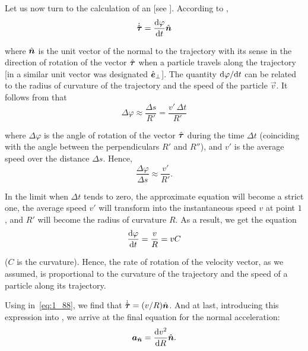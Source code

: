 Let us now turn to the calculation of an [see ]. According to ,
\begin{equation}\label{eq:1_88}
\dot{\hat{\boldsymbol{\tau}}} = \frac{\mathrm{d}\varphi}{\mathrm{d} t}\hat{\boldsymbol{n}}
\end{equation}

\noindent
where $\hat{\boldsymbol{n}}$ is the unit vector of the normal to the trajectory with its sense in the direction of rotation of the vector $\hat{\boldsymbol{\tau}}$ when a particle travels along the trajectory [in  a similar unit vector was designated $\hat{\boldsymbol{e}}_{\perp}$]. The quantity $\mathrm{d}\varphi/\mathrm{d} t$ can be related to the radius of curvature of the trajectory and the speed of the particle $\vec{v}$. It follows from  that
\begin{equation*}
\Delta\varphi\approx \frac{\Delta s}{R'} = \frac{v'\,\Delta t}{R'}
\end{equation*}

\noindent
where $\Delta\varphi$ is the angle of rotation of the vector $\hat{\boldsymbol{\tau}}$ during the time $\Delta t$ (coinciding with the angle between the perpendiculars $R'$ and $R''$), and $v'$ is the average speed over the distance $\Delta s$. Hence,
\begin{equation*}
\frac{\Delta\varphi}{\Delta s} \approx \frac{v'}{R'}.
\end{equation*}

\noindent
In the limit when $\Delta t$ tends to zero, the approximate equation will become a strict one, the average speed $v'$ will transform into the instantaneous speed $v$ at point $1$, and $R'$ will become the radius of curvature $R$. As a result, we get the equation
\begin{equation}\label{eq:1_89}
\frac{\mathrm{d}\varphi}{\mathrm{d} t} = \frac{v}{R} = vC
\end{equation}

\noindent
($C$ is the curvature). Hence, the rate of rotation of the velocity vector, as we assumed, is proportional to the curvature of the trajectory and the speed of a particle along its trajectory.

Using  in~\eqref{eq:1_88}, we find that $\dot{\hat{\boldsymbol{\tau}}}=(v/R)\hat{\boldsymbol{n}}$. And at last, introducing this expression into , we arrive at the final equation for the normal acceleration:
\vspace{-12pt}
\begin{equation}\label{eq:1_90}
\boldsymbol{a}_{\hat{\boldsymbol{n}}} = \frac{\mathrm{d} v^2}{\mathrm{d} R}\hat{\boldsymbol{n}}.
\end{equation}

